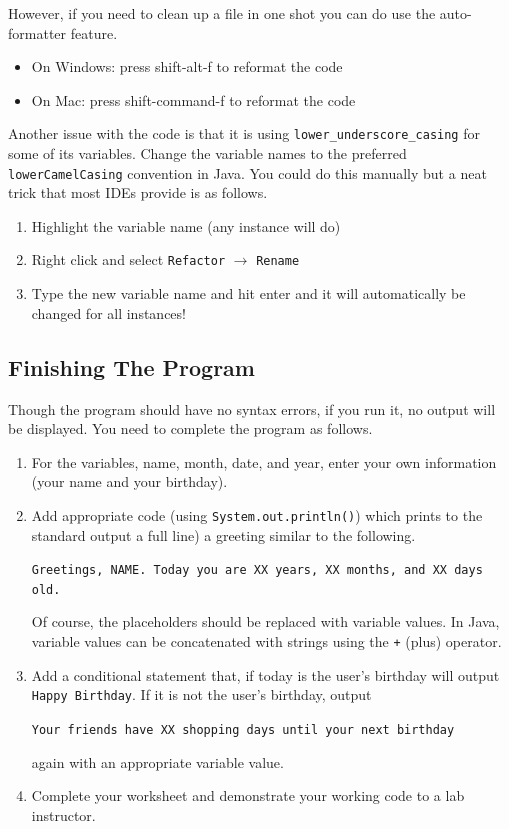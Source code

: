 \documentclass[12pt]{scrartcl}
\begin{document}
However, if you need to clean up a file in one shot you can do use the
auto-formatter feature.  

\begin{itemize}
  \item On Windows: press shift-alt-f to reformat the code
  \item On Mac: press shift-command-f to reformat the code
\end{itemize}

Another issue with the code is that it is using \texttt{lower_underscore_casing} for some of its variables.  Change the 
variable names to the preferred \texttt{lowerCamelCasing} 
convention in Java.  You could do this manually but a neat trick that
most IDEs provide is as follows.

\begin{enumerate}
  \item Highlight the variable name (any instance will do)
  \item Right click and select \texttt{Refactor} $\rightarrow$ \texttt{Rename}
  \item Type the new variable name and hit enter and it will automatically be changed for all instances!  
\end{enumerate}

\subsection{Finishing The Program}

Though the program should have no syntax errors, if you run it, no 
output will be displayed.  You need to complete the program as follows.

\begin{enumerate}
  \item For the variables, name, month, date, and year, enter your 
  	own information (your name and your birthday).
  \item Add appropriate code (using \texttt{System.out.println()})
    which prints to the standard output a full line) a greeting similar
    to the following. 
    
    \texttt{Greetings, NAME.  Today you are XX years, 
    XX months, and XX days old.}  
    
    Of course, the placeholders should
    be replaced with variable values.  In Java, variable values can be
    concatenated with strings using the \texttt{+} (plus) 
    operator.
  \item Add a conditional statement that, if today is the user's birthday 
    will output \texttt{Happy Birthday}.  If it is not the 
    user's birthday, output 
    
    \texttt{Your friends have XX shopping days until your next birthday} 
    
    again with an appropriate variable
    value.
  \item Complete your worksheet and demonstrate your working code to a 
  	lab instructor.
\end{enumerate}
\end{document}
